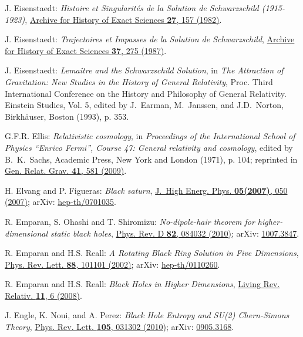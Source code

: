 \begin{thebibliography}{123}
J. Eisenstaedt:
{\em Histoire et Singularit\'es de la Solution de Schwarzschild (1915-1923)},
\href{https://doi.org/10.1007/BF00348347}{Archive for History of Exact Sciences {\bf 27}, 157 (1982)}.

J. Eisenstaedt:
{\em Trajectoires et Impasses de la Solution de Schwarzschild},
\href{https://doi.org/10.1007/BF00417007}{Archive for History of Exact Sciences {\bf 37}, 275 (1987)}.

J. Eisenstaedt: {\em Lemaître and the Schwarzschild Solution}, in
{\em The Attraction of Gravitation: New Studies in the History of
General Relativity}, Proc. Third International Conference on the History and Philosophy of General Relativity. Einstein
Studies, Vol. 5, edited by J.~Earman, M.~Janssen, and J.D.~Norton,
Birkhäuser, Boston (1993), p. 353.

G.F.R. Ellis:
{\em Relativistic cosmology},
in  {\em Proceedings of the International School of Physics ``Enrico Fermi'',
Course 47: General relativity and cosmology}, edited by B.~K.~Sachs,
Academic Press, New York and London (1971), p. 104;
reprinted in \href{https://doi.org/10.1007/s10714-009-0760-7}{Gen. Relat. Grav. {\bf 41}, 581 (2009)}.

H. Elvang and P. Figueras:
{\em Black saturn},
\href{https://doi.org/10.1088/1126-6708/2007/05/050}{J.~High Energ. Phys. {\bf 05(2007)}, 050 (2007)};
arXiv: \href{https://arxiv.org/abs/hep-th/0701035}{hep-th/0701035}.

R. Emparan, S. Ohashi and T. Shiromizu:
{\em No-dipole-hair theorem for higher-dimensional static black holes},
\href{https://doi.org/10.1103/PhysRevD.82.084032}{Phys. Rev. D {\bf 82}, 084032 (2010)};
arXiv: \href{https://arxiv.org/abs/1007.3847}{1007.3847}.

R. Emparan and H.S. Reall:
{\em A Rotating Black Ring Solution in Five Dimensions},
\href{https://doi.org/10.1103/PhysRevLett.88.101101}{Phys. Rev. Lett. {\bf 88}, 101101 (2002)};
arXiv: \href{https://arxiv.org/abs/hep-th/0110260}{hep-th/0110260}.

R. Emparan and H.S. Reall:
{\em Black Holes in Higher Dimensions},
\href{https://doi.org/10.12942/lrr-2008-6}{Living Rev. Relativ. {\bf 11}, 6 (2008)}.

J. Engle, K. Noui, and A. Perez:
{\em Black Hole Entropy and SU(2) Chern-Simons Theory},
\href{https://doi.org/10.1103/PhysRevLett.105.031302}{Phys. Rev. Lett. {\bf 105}, 031302 (2010)};
arXiv: \href{https://arxiv.org/abs/0905.3168}{0905.3168}.


\end{thebibliography}
